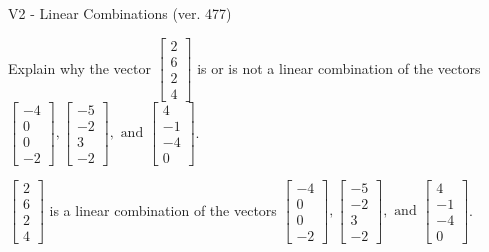 \begin{exercise}
  \begin{exerciseTitle}V2 - Linear Combinations (ver. 477)\end{exerciseTitle}
  \begin{exerciseStatement}
    Explain why the vector \(\left[\begin{array}{c}
2 \\
6 \\
2 \\
4
\end{array}\right]\)  is or is not a linear 
	combination of the vectors \(\left[\begin{array}{c}
-4 \\
0 \\
0 \\
-2
\end{array}\right] , \left[\begin{array}{c}
-5 \\
-2 \\
3 \\
-2
\end{array}\right] , \text{ and } \left[\begin{array}{c}
4 \\
-1 \\
-4 \\
0
\end{array}\right]\).
	


  \end{exerciseStatement}
  \begin{exerciseAnswer}
   \(\left[\begin{array}{c}
2 \\
6 \\
2 \\
4
\end{array}\right]\) 
  	 is  
	a linear combination of the vectors \(\left[\begin{array}{c}
-4 \\
0 \\
0 \\
-2
\end{array}\right] , \left[\begin{array}{c}
-5 \\
-2 \\
3 \\
-2
\end{array}\right] , \text{ and } \left[\begin{array}{c}
4 \\
-1 \\
-4 \\
0
\end{array}\right]\).

	
  


  \end{exerciseAnswer}
\end{exercise}